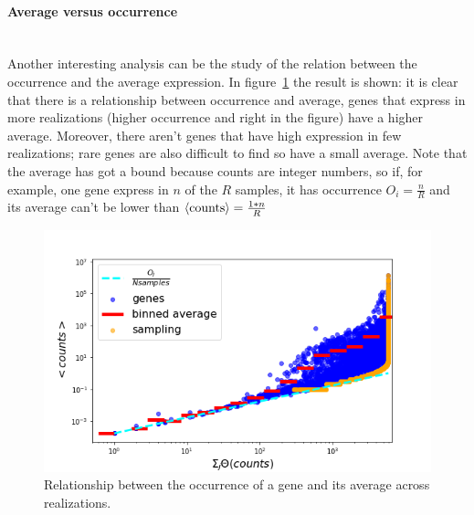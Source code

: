 \paragraph{Average versus occurrence}\mbox{}\\
Another interesting analysis can be the study of the relation between the occurrence and the average expression. In figure~\ref{fig:scalinglaws/gtex/meanDiff_binned_sampling} the result is shown: it is clear that there is a relationship between occurrence and average, genes that express in more realizations (higher occurrence and right in the figure) have a higher average. Moreover, there aren't genes that have high expression in few realizations; rare genes are also difficult to find so have a small average. Note that the average has got a bound because counts are integer numbers, so if, for example, one gene express in $n$ of the $R$ samples, it has occurrence $O_i=\frac{n}{R}$ and its average can't be lower than $\left\langle \mathrm{counts}\right\rangle=\frac{1*n}{R}$
\begin{figure}[htb!]
    \centering
    \includegraphics[width=0.9\linewidth]{pictures/scalinglaws/gtex/meanDiff_binned_sampling.png}
    \caption{Relationship between the occurrence of a gene and its average across realizations.}
    \label{fig:scalinglaws/gtex/meanDiff_binned_sampling}
\end{figure}
